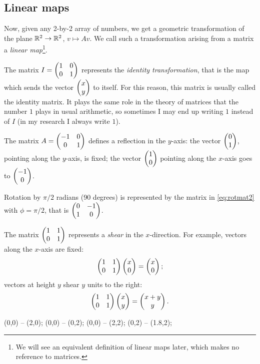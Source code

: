 \documentclass{article}
\begin{document}
\subsection{Linear maps}


Now, given any 2-by-2 array of numbers, we get a geometric
transformation of the plane \(\mathbb{R}^2\to\mathbb{R}^2\), \(v\mapsto Av\). We
call such a transformation arising from a matrix a {\em linear
map}\footnote{We will see an equivalent definition of linear maps
later, which makes no reference to matrices.}.


\begin{Example}
The matrix \(I=\begin{pmatrix} 1 & 0 \\ 0 & 1\end{pmatrix}\) represents the {\em identity
transformation}, that is the map which sends the vector \(\begin{pmatrix} x \\ y
\end{pmatrix}\) to itself. For this reason, this matrix is usually called the
identity matrix. It plays the same role in the theory of matrices
that the number \(1\) plays in usual arithmetic, so sometimes I may
end up writing \(1\) instead of \(I\) (in my research I always write
\(1\)).


\end{Example}
\begin{Example}
The matrix \(A=\begin{pmatrix} -1 & 0 \\ 0 & 1 \end{pmatrix}\) defines a reflection in the
\(y\)-axis: the vector \(\begin{pmatrix} 0 \\ 1\end{pmatrix}\), pointing along the
\(y\)-axis, is fixed; the vector \(\begin{pmatrix} 1 \\ 0 \end{pmatrix}\) pointing along
the \(x\)-axis goes to \(\begin{pmatrix} -1 \\ 0 \end{pmatrix}\).


\end{Example}
\begin{Example}
Rotation by \(\pi/2\) radians (90 degrees) is represented by the
matrix in \cref{eq:rotmat2} with \(\phi=\pi/2\), that is \(\begin{pmatrix} 0 &
-1\\ 1 & 0\end{pmatrix}\).


\end{Example}
\begin{Example}
The matrix \(\begin{pmatrix} 1 & 1 \\ 0 & 1\end{pmatrix}\) represents a {\em shear} in the
\(x\)-direction. For example, vectors along the \(x\)-axis are
fixed:
\[\begin{pmatrix} 1 & 1\\0 & 1\end{pmatrix}\begin{pmatrix} x \\ 0\end{pmatrix} =\begin{pmatrix} x \\ 0\end{pmatrix};\]
vectors at height \(y\) shear \(y\) units to the right:
\[\begin{pmatrix} 1 & 1\\0 & 1\end{pmatrix}\begin{pmatrix} x \\ y\end{pmatrix} =\begin{pmatrix} x+y \\ y\end{pmatrix}.\]


\tka
{} (0,0) -- (2,0);
 (0,0) -- (0,2);
 (0,0) -- (2,2);
 (0,2) -- (1.8,2);
\tkz


\end{Example}
\end{document}
